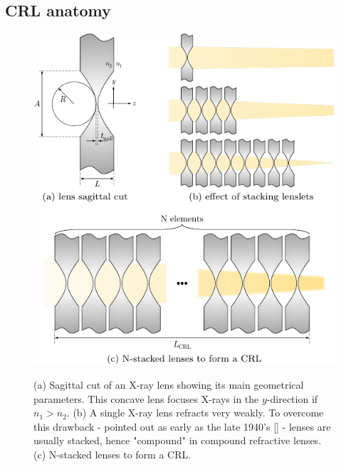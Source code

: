 \begin{refsection}

\subsection{CRL anatomy}\label{sec:CRL_anatomy}

\begin{figure}[t]
    \centering
    {\includegraphics[width=0.5\linewidth]{figures/ch03/anatomy.pdf}}
    \caption[CRL anatomy]{(a) Sagittal cut of an X-ray lens showing its main geometrical parameters. This concave lens focuses X-rays in the $y$-direction if $n_1>n_2$. (b) A single X-ray lens refracts very weakly. To overcome this drawback - pointed out as early as the late 1940's [\cite{Kirkpatrick1948}] - lenses are usually stacked, hence "compound" in compound refractive lenses. (c) N-stacked lenses to form a CRL.}
    \label{fig:CRLs}
\end{figure}


\end{refsection}
